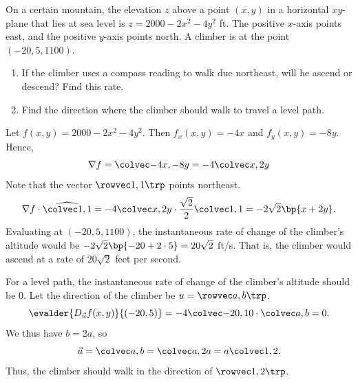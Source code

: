 \begin{problem}
    On a certain mountain, the elevation $z$ above a point $(x, y)$ in a horizontal $xy$-plane that lies at sea level is $z = 2000 - 2x^2 - 4y^2$ ft. The positive $x$-axis points east, and the positive $y$-axis points north. A climber is at the point $(-20, 5, 1100)$.

    \begin{enumerate}
        \item If the climber uses a compass reading to walk due northeast, will he ascend or descend? Find this rate.
        \item Find the direction where the climber should walk to travel a level path.
    \end{enumerate}
\end{problem}
\begin{solution}
    \begin{ppart}
        Let $f(x, y) = 2000 - 2x^2 - 4y^2$. Then $f_x(x, y) = -4x$ and $f_y(x, y) = -8y$. Hence, \[\nabla f = \cvecii{-4x}{-8y} = -4\cvecii{x}{2y}\] Note that the vector $\cveciix11$ points northeast. \[\nabla f \cdot \widehat{\cvecii11} = -4\cvecii{x}{2y} \cdot \frac{\sqrt2}{2} \cvecii11 = -2\sqrt2 \bp{x + 2y}.\] Evaluating at $(-20, 5, 1100)$, the instantaneous rate of change of the climber's altitude would be $-2\sqrt2\bp{-20 + 2\cdot5} = 20\sqrt2$ ft/s. That is, the climber would ascend at a rate of $20\sqrt2$ feet per second.
    \end{ppart}
    \begin{ppart}
        For a level path, the instantaneous rate of change of the climber's altitude should be 0. Let the direction of the climber be $u = \cveciix{a}{b}$. \[\evalder{D_{\vec u} f(x, y)}{(-20, 5)} = -4\cvecii{-20}{10} \cdot \cvecii{a}{b} = 0.\] We thus have $b = 2a$, so \[\vec u = \cvecii{a}{b} = \cvecii{a}{2a} = a\cvecii12.\] Thus, the climber should walk in the direction of $\cveciix{1}{2}$.
    \end{ppart}
\end{solution}

